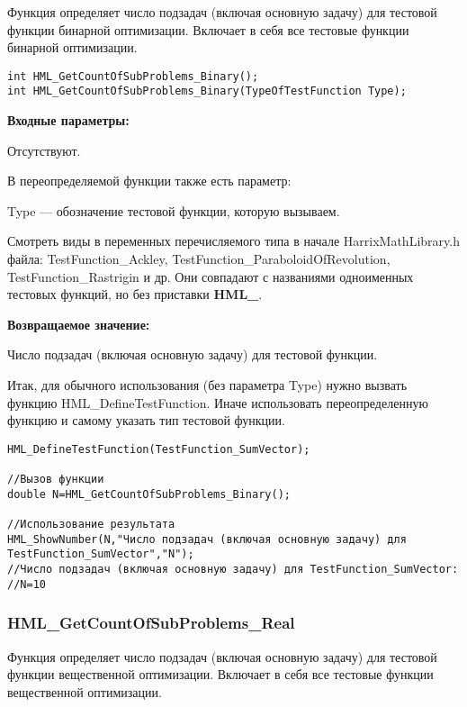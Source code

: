 \documentclass[a4paper,12pt]{article}
\begin{document}
Функция определяет число подзадач (включая основную задачу) для тестовой функции бинарной оптимизации. Включает в себя все тестовые функции бинарной оптимизации.


\begin{lstlisting}[label=code_syntax_HML_GetCountOfSubProblems_Binary,caption=Синтаксис]
int HML_GetCountOfSubProblems_Binary();
int HML_GetCountOfSubProblems_Binary(TypeOfTestFunction Type);
\end{lstlisting}

\textbf{Входные параметры:}

Отсутствуют.

В переопределяемой функции также есть параметр:
  
Type --- обозначение тестовой функции, которую вызываем.

Смотреть виды в переменных перечисляемого типа в начале HarrixMathLibrary.h файла: TestFunction\_Ackley, TestFunction\_ParaboloidOfRevolution, TestFunction\_Rastrigin и др. Они совпадают с названиями одноименных тестовых функций, но без приставки \textbf{HML\_}.

\textbf{Возвращаемое значение:}
 
Число подзадач (включая основную задачу) для тестовой функции.

Итак, для обычного использования (без параметра Type) нужно вызвать функцию HML\_DefineTestFunction. Иначе использовать переопределенную функцию и самому указать тип тестовой функции.


\begin{lstlisting}[label=code_use_HML_GetCountOfSubProblems_Binary,caption=Пример использования]
HML_DefineTestFunction(TestFunction_SumVector);

//Вызов функции
double N=HML_GetCountOfSubProblems_Binary();

//Использование результата
HML_ShowNumber(N,"Число подзадач (включая основную задачу) для TestFunction_SumVector","N");
//Число подзадач (включая основную задачу) для TestFunction_SumVector:
//N=10
\end{lstlisting}

\subsubsection{HML\_GetCountOfSubProblems\_Real}\label{HML_GetCountOfSubProblems_Real}

Функция определяет число подзадач (включая основную задачу) для тестовой функции вещественной оптимизации. Включает в себя все тестовые функции вещественной оптимизации.
\end{document}
